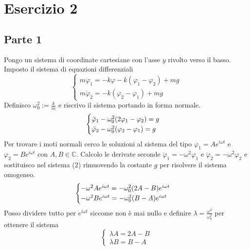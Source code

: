 \documentclass{scrartcl}
\renewcommand{\phi}{\varphi}
\begin{document}
\section*{Esercizio 2}
\subsection*{Parte 1}
\setcounter{equation}{0}
    Pongo un sistema di coordinate cartesiane con l'asse \(y\) rivolto verso il basso.
    Imposto il sistema di equazioni differenziali
    \begin{equation}
        \begin{cases}
            m \ddot \phi_1 = -k \phi -k(\phi_1 - \phi_2) + mg \\
            m \ddot \phi_2 = -k (\phi_2 - \phi_1) +mg
        \end{cases}
    \end{equation}
    Definisco \(\omega_0^2 := \frac{k}{m}\) e riscrivo il sistema portando in forma normale.
    \begin{equation}
        \begin{cases}
            \ddot \phi_1 - \omega_0^2 \qty(2 \phi_1 - \phi_2) = g \\
            \ddot \phi_2 - \omega_0^2 \qty(\phi_2 - \phi_1) = g
        \end{cases}
    \end{equation}
    Per trovare i moti normali cerco le soluzioni al sistema del tipo \(\phi_1 = A e^{i\omega t}\) e \(\phi_2 = B e^{i \omega t}\) con \(A, B \in \mathbb{C}\).
    Calcolo le derivate seconde \(\ddot \phi_1 = - \omega^2 \phi_1\) e \(\ddot \phi_2 = - \omega^2 \phi_2\) e sostituisco nel sistema (2) rimuovendo la costante \(g\) per risolvere il sistema omogeneo.
    \begin{equation}
        \begin{cases}
            - \omega^2 A e^{i \omega t} = - \omega_0^2 \qty(2A -B) e^{i \omega t} \\
            - \omega^2 B e^{i \omega t} = - \omega_0^2 \qty(B-A) e^{i \omega t}
        \end{cases}
    \end{equation}
    Posso dividere tutto per \(e^{i \omega t}\) siccome non è mai nullo e definire \(\lambda = \frac{\omega^2}{\omega_0^2}\) per ottenere il sistema
    \begin{equation}
        \begin{cases}
            \lambda A = 2A-B \\
            \lambda B = B-A
        \end{cases}
    \end{equation}
\end{document}
